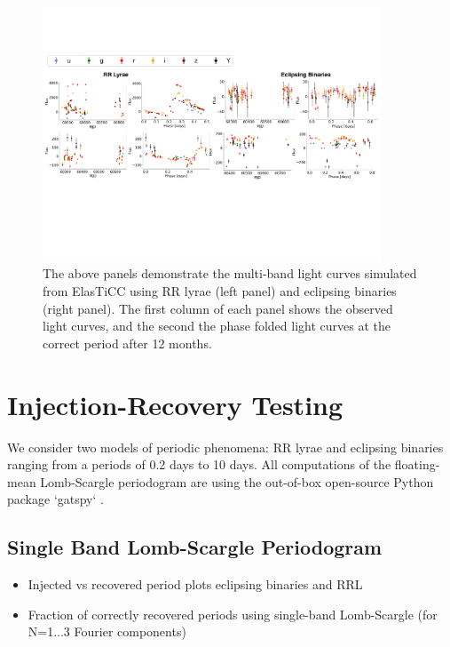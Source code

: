 \documentclass[DM,authoryear,toc]{lsstdoc}
\begin{document}
\begin{figure}
  \includegraphics[width=0.9\textwidth]{figures/lightcurve_demo.pdf}
  \centering 
  \caption{The above panels demonstrate the multi-band light curves simulated from ElasTiCC using RR lyrae (left panel) and eclipsing binaries (right panel). The first column of each panel shows the observed light curves, and the second the phase folded light curves at the correct period after 12 months.}
  \label{fig:comp}
\end{figure}


\section{Injection-Recovery Testing}
We consider two models of periodic phenomena: RR lyrae and eclipsing binaries ranging from a periods of 0.2 days to 10 days. All computations of the floating-mean Lomb-Scargle periodogram are using the out-of-box open-source Python package `gatspy` \citet{VanderPlas:VP2015}. 



\subsection{Single Band Lomb-Scargle Periodogram}

\begin{itemize}
\item Injected vs recovered period plots eclipsing binaries and RRL
\item Fraction of correctly recovered periods using single-band Lomb-Scargle (for N=1...3 Fourier components)  
\end{itemize}
\end{document}
